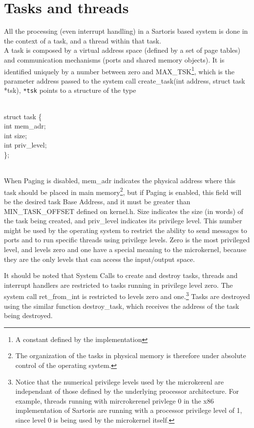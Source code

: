 \documentclass[11pt, letterpaper, twoside, english]{book}
\begin{document}
\section{Tasks and threads}
All the processing (even interrupt handling) in a Sartoris based system is done in the context of a task, and a thread within that task. \\
A task is composed by a virtual address space (defined by a set of page tables) and communication mechanisms (ports and shared memory objects). It is identified uniquely by a number between zero and \textsf{MAX\_TSK}\footnote{A constant defined by the implementation}, which is the parameter \textsf{address} passed to the system call \textsf{create\_task(int address, struct task *tsk)}, \verb|*tsk| points to a structure of the type \\
\\
\begin{sf} \noindent struct task \{ \\
\indent  int mem\_adr; \\
\indent  int size; \\
\indent  int priv\_level; \\
\}; \\
\end{sf}
\\
\noindent 
When Paging is disabled, \textsf{mem\_adr} indicates the physical address where this task should be placed in main memory\footnote{The organization of the tasks in physical memory is therefore under absolute control of the operating system.}, but if Paging is enabled, this field will be the desired task Base Address, and it must be greater than \textsf{MIN\_TASK\_OFFSET} defined on \textsf{kernel.h}.
\textsf{Size} indicates the size (in words) of the task being created, and \textsf{priv\_level} indicates its privilege level. This number might be used by the operating system to restrict the ability to send messages to ports and to run specific threads using privilege levels. Zero is the most privileged level, and levels zero and one have a special meaning to the microkernel, because they are the only levels that can access the input$/$output space. 

It should be noted that System Calls to create and destroy tasks, threads and interrupt handlers are restricted to tasks running in privilege level zero. The system call \textsf{ret\_from\_int} is restricted to levels zero and one.\footnote{Notice that the numerical privilege levels used by the microkerenl are independant of those defined by the underlying processor architecture. For example, threads running with mircrokerenel privlege 0 in the x86 implementation of Sartoris are running with a processor privilege level of 1, since level 0 is being used by the microkernel itself.}
Tasks are destroyed using the similar function \textsf{destroy\_task}, which receives the address of the task being destroyed.
\end{document}
